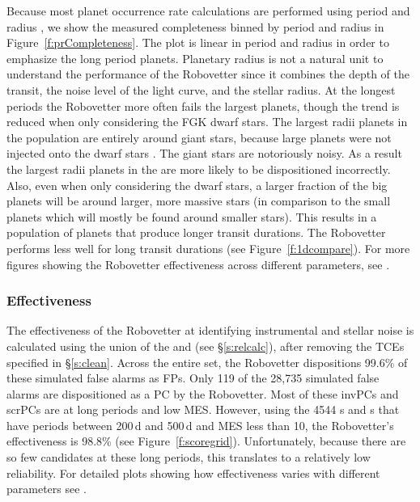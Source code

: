 Because most planet occurrence rate calculations are performed using period and radius \citep[e.g.,][]{Burke2015}, we show the measured completeness binned by period and radius in Figure~\ref{f:prCompleteness}. The plot is linear in period and radius in order to emphasize the long period planets. Planetary radius is not a natural unit to understand the performance of the Robovetter since it combines the depth of the transit, the noise level of the light curve, and the stellar radius.  At the longest periods the Robovetter more often fails the largest planets, though the trend is reduced when only considering the FGK dwarf stars. The largest radii planets in the \injtce{} population are entirely around giant stars, because large planets were not injected onto the dwarf stars \citep{Christiansen2017}. The giant stars are notoriously noisy. As a result the largest radii planets in the  are more likely to be dispositioned incorrectly. Also, even when only considering the dwarf stars, a larger fraction of the big planets will be around larger, more massive stars (in comparison to the small planets which will mostly be found around smaller stars). This results in a population of planets that produce longer transit durations. The Robovetter performs less well for long transit durations (see Figure~\ref{f:1dcompare}). For more figures showing the Robovetter effectiveness across different parameters, see \citet{Coughlin2017a}.


\subsubsection{Effectiveness}
The effectiveness of the Robovetter at identifying instrumental and stellar noise is calculated using the union of the  and  (see \S\ref{s:relcalc}), after removing the TCEs specified in \S\ref{s:clean}. Across the entire set, the Robovetter dispositions 99.6\% of these simulated false alarms as FPs.  Only 119 of the 28,735 simulated false alarms are dispositioned as a PC by the Robovetter.  Most of these invPCs and scrPCs are at long periods and low MES. However, using the 4544 \invtce s and \scrtce s that have periods between 200\,d and 500\,d and MES less than 10, the Robovetter's effectiveness is 98.8\% (see Figure~\ref{f:scoregrid}).  Unfortunately, because there are so few candidates at these long periods, this translates to a relatively low reliability.  For detailed plots showing how effectiveness varies with different parameters see \citet{Coughlin2017a}.


